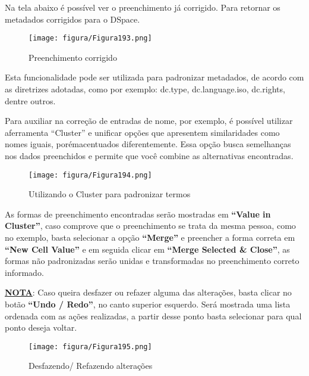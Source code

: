 \documentclass[12pt,hidelinks]{article}
\begin{document}
    Na tela abaixo é possível ver o preenchimento já corrigido. Para retornar os metadados corrigidos para o DSpace.
    
    \begin{figure}[!htp]
                \centering
                \texttt{[image: figura/Figura193.png]}
                \caption{Preenchimento corrigido}
            \label{Rotulo}
        \end{figure}
    
    Esta funcionalidade pode ser utilizada para padronizar metadados, de acordo com as diretrizes adotadas, como por exemplo: dc.type, dc.language.iso, dc.rights, dentre outros.
    
    \singlespacing
    
    Para auxiliar na correção de entradas de nome, por exemplo, é possível utilizar aferramenta “Cluster” e unificar opções que apresentem similaridades como nomes iguais, porémacentuados diferentemente. Essa opção busca semelhanças nos dados preenchidos e permite que você combine as alternativas encontradas.
    
    \begin{figure}[!htp]
                \centering
                \texttt{[image: figura/Figura194.png]}
                \caption{Utilizando o Cluster para padronizar termos}
            \label{Rotulo}
        \end{figure}
        
\newpage

    As formas de preenchimento encontradas serão mostradas em \textbf{“Value in Cluster”}, caso comprove que o preenchimento se trata da mesma pessoa, como no exemplo, basta selecionar a opção \textbf{“Merge”} e preencher a forma correta em \textbf{“New Cell Value”} e em seguida clicar em \textbf{“Merge Selected \& Close”}, as formas não padronizadas serão unidas e transformadas no preenchimento correto informado.
    
    \singlespacing
    
    \underline{\textbf{NOTA}}: Caso queira desfazer ou refazer alguma das alterações, basta clicar no botão \textbf{“Undo / Redo”}, no canto superior esquerdo. Será mostrada uma lista ordenada com as ações realizadas, a partir desse ponto basta selecionar para qual ponto deseja voltar. 
    
    \begin{figure}[!htp]
                \centering
                \texttt{[image: figura/Figura195.png]}
                \caption{Desfazendo/ Refazendo alterações}
            \label{Rotulo}
        \end{figure}
\end{document}

